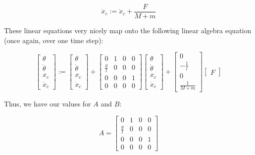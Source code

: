 \documentclass[12pt]{article}
\begin{document}
\begin{equation}
    \dot x _c := \displaystyle \dot x _c + \frac{\displaystyle F}{\displaystyle M + m}
\end{equation}

These linear equations very nicely map onto the following linear algebra equation (once again, over one time step):

\begin{equation}
    \displaystyle
    \begin{bmatrix}
        \theta \\
        \dot \theta \\
        x _c \\
        \dot x _c
    \end{bmatrix}
    := \begin{bmatrix}
        \theta \\
        \dot \theta \\
        x _c \\
        \dot x _c
    \end{bmatrix}
    + \begin{bmatrix}
        0 & 1 & 0 & 0 \\
        \frac{g}{l} & 0 & 0 & 0 \\
        0 & 0 & 0 & 1 \\
        0 & 0 & 0 & 0
    \end{bmatrix}
    \begin{bmatrix}
        \theta \\
        \dot \theta \\
        x _c \\
        \dot x _c
    \end{bmatrix}
    + \begin{bmatrix}
        0 \\
        - \frac{1}{l} \\
        0 \\
        \frac{1}{M + m}
    \end{bmatrix}
    \begin{bmatrix}
        F
    \end{bmatrix}
\end{equation}

Thus, we have our values for $A$ and $B$:

\begin{equation}
    \displaystyle A = \begin{bmatrix}
        0 & 1 & 0 & 0 \\
        \frac{g}{l} & 0 & 0 & 0 \\
        0 & 0 & 0 & 1 \\
        0 & 0 & 0 & 0
    \end{bmatrix}
\end{equation}
\end{document}
